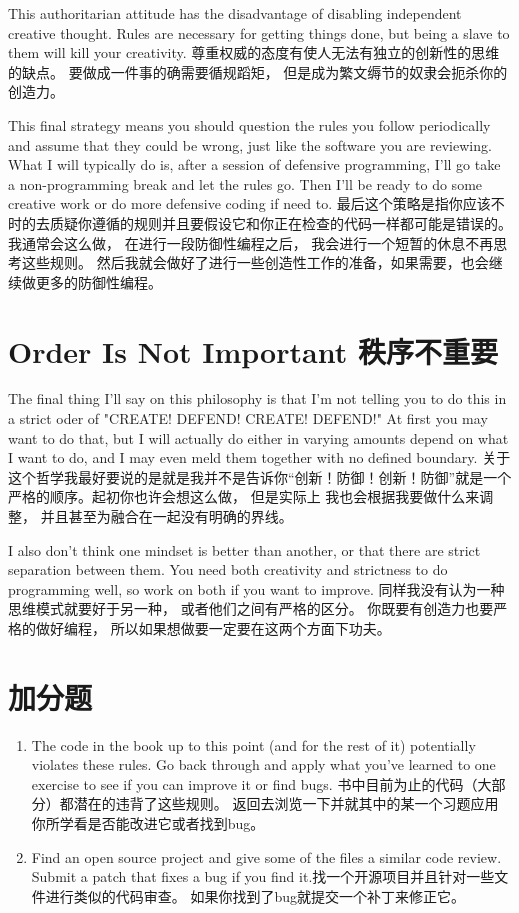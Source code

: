 This authoritarian attitude has the disadvantage of disabling independent 
creative thought.  Rules are necessary for getting things done, but being
a slave to them will kill your creativity. 尊重权威的态度有使人无法有独立的创新性的思维的缺点。 要做成一件事的确需要循规蹈矩， 但是成为繁文缛节的奴隶会扼杀你的创造力。

This final strategy means you should question the rules you follow periodically
and assume that they could be wrong, just like the software you are reviewing.
What I will typically do is, after a session of defensive programming, I'll go
take a non-programming break and let the rules go.  Then I'll be ready to do
some creative work or do more defensive coding if need to. 最后这个策略是指你应该不时的去质疑你遵循的规则并且要假设它和你正在检查的代码一样都可能是错误的。 我通常会这么做， 在进行一段防御性编程之后， 我会进行一个短暂的休息不再思考这些规则。 然后我就会做好了进行一些创造性工作的准备，如果需要，也会继续做更多的防御性编程。

\section{Order Is Not Important 秩序不重要}

The final thing I'll say on this philosophy is that I'm not telling you to do this in
a strict oder of "CREATE! DEFEND! CREATE! DEFEND!"  At first you may want to do that,
but I will actually do either in varying amounts depend on what I want to do, and I may
even meld them together with no defined boundary. 关于这个哲学我最好要说的是就是我并不是告诉你“创新！防御！创新！防御”就是一个严格的顺序。起初你也许会想这么做， 但是实际上
我也会根据我要做什么来调整， 并且甚至为融合在一起没有明确的界线。

I also don't think one mindset is better than another, or that there are strict separation
between them.  You need both creativity and strictness to do programming well, so work
on both if you want to improve. 同样我没有认为一种思维模式就要好于另一种， 或者他们之间有严格的区分。
你既要有创造力也要严格的做好编程， 所以如果想做要一定要在这两个方面下功夫。

\section{加分题}

\begin{enumerate}
\item The code in the book up to this point (and for the rest of it) potentially violates these rules.  Go back through and apply what you've learned to one exercise to see if you can improve it or find bugs. 书中目前为止的代码（大部分）都潜在的违背了这些规则。 返回去浏览一下并就其中的某一个习题应用你所学看是否能改进它或者找到bug。
\item Find an open source project and give some of the files a similar code review.  Submit a patch that fixes a bug if you find it.找一个开源项目并且针对一些文件进行类似的代码审查。 如果你找到了bug就提交一个补丁来修正它。
\end{enumerate}

